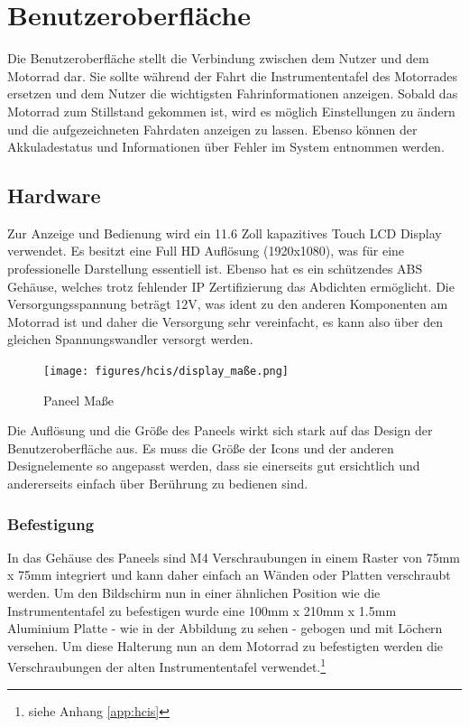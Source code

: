 \newpage


\section{Benutzeroberfläche}
Die Benutzeroberfläche stellt die Verbindung zwischen dem Nutzer und dem Motorrad dar. Sie sollte während der Fahrt die Instrumententafel des Motorrades ersetzen und dem Nutzer die wichtigsten Fahrinformationen anzeigen. Sobald das Motorrad zum Stillstand gekommen ist, wird es möglich Einstellungen zu ändern und die aufgezeichneten Fahrdaten anzeigen zu lassen. Ebenso können der Akkuladestatus und Informationen über Fehler im System entnommen werden.

\subsection{Hardware}

Zur Anzeige und Bedienung wird ein 11.6 Zoll kapazitives Touch LCD Display verwendet. Es besitzt eine Full HD Auflösung (1920x1080), was für eine professionelle Darstellung essentiell ist. Ebenso hat es ein schützendes ABS Gehäuse, welches trotz fehlender IP Zertifizierung das Abdichten ermöglicht. Die Versorgungsspannung beträgt 12V, was ident zu den anderen Komponenten am Motorrad ist und daher die Versorgung sehr vereinfacht, es kann also über den gleichen Spannungswandler versorgt werden.

\begin{figure}[H]
	\begin{center}
		\texttt{[image: figures/hcis/display\_maße.png]}
		\caption{Paneel Maße}
		\label{fig:panel}
	\end{center}
\end{figure}

Die Auflösung und die Größe des Paneels wirkt sich stark auf das Design der Benutzeroberfläche aus. Es muss die Größe der Icons und der anderen Designelemente so angepasst werden, dass sie einerseits gut ersichtlich und andererseits einfach über Berührung zu bedienen sind.\\

\newpage

\subsubsection{Befestigung}
In das Gehäuse des Paneels sind M4 Verschraubungen in einem Raster von 75mm x 75mm integriert und kann daher einfach an Wänden oder Platten verschraubt werden. Um den Bildschirm nun in einer ähnlichen Position wie die Instrumententafel zu befestigen wurde eine 100mm x 210mm x 1.5mm Aluminium Platte - wie in der Abbildung zu sehen - gebogen und mit Löchern versehen. Um diese Halterung nun an dem Motorrad zu befestigten werden die Verschraubungen der alten Instrumententafel verwendet.\footnote{siehe Anhang \ref{app:hcis}}

